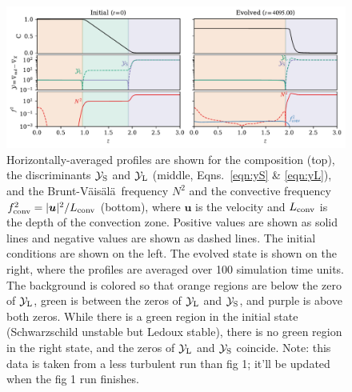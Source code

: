 \documentclass[twocolumn, linenumbers]{aastex631}
\newcommand{\yL}{\ensuremath{\mathcal{Y}_{\rm{L}}}}
\newcommand{\yS}{\ensuremath{\mathcal{Y}_{\rm{S}}}}
\newcommand{\brunt}{{Brunt-V\"{a}is\"{a}l\"{a}}}
\renewcommand{\vec}[1]{\boldsymbol{#1}}
\begin{document}
\begin{figure}[t]
\centering
\includegraphics[width=\textwidth]{fig2_profiles.pdf}
\caption{
    Horizontally-averaged profiles are shown for the composition (top), the discriminants $\yS$ and $\yL$ (middle, Eqns.~\ref{eqn:yS} \& \ref{eqn:yL}), and the \brunt$\,$ frequency $N^2$ and the convective frequency $f_{\rm{conv}}^2 = |\vec{u}|^2/L_{\rm{conv}}$ (bottom), where $\vec{u}$ is the velocity and $L_{\rm{conv}}$ is the depth of the convection zone.
    Positive values are shown as solid lines and negative values are shown as dashed lines.
    The initial conditions are shown on the left.
    The evolved state is shown on the right, where the profiles are averaged over 100 simulation time units.
    The background is colored so that orange regions are below the zero of $\yL$, green is between the zeros of $\yL$ and $\yS$, and purple is above both zeros.
    While there is a green region in the initial state (Schwarzschild unstable but Ledoux stable), there is no green region in the right state, and the zeros of  $\yL$ and $\yS$ coincide.
    {\color{blue} Note: this data is taken from a less turbulent run than fig 1; it'll be updated when the fig 1 run finishes.}
\label{fig:profiles}
}
\end{figure}




\end{document}
